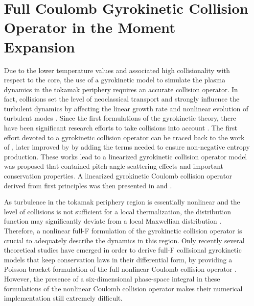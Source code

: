 \chapter{Full Coulomb Gyrokinetic Collision Operator in the Moment Expansion}
\label{ch:op}

Due to the lower temperature values and associated high collisionality with respect to the core, the use of a gyrokinetic model to simulate the plasma dynamics in the tokamak periphery requires an accurate collision operator.
%
In fact, collisions set the level of neoclassical transport and strongly influence the turbulent dynamics by affecting the linear growth rate and nonlinear evolution of turbulent modes \citep{Hirshman1981,Lin1999,Barnes2009}.
%
Since the first formulations of the gyrokinetic theory, there have been significant research efforts to take collisions into account \citep{Catto1977,Brizard2004,Abel2008,Barnes2009,Li2011,Esteve2015}.
%
The first effort devoted to a gyrokinetic collision operator can be traced back to the work of \citet{Catto1977}, later improved by \citet{Abel2008} by adding the terms needed to ensure non-negative entropy production.
%
These works lead to a linearized gyrokinetic collision operator model was proposed that contained pitch-angle scattering effects and important conservation properties.
%
A linearized gyrokinetic Coulomb collision operator derived from first principles was then presented in \citet{Li2011} and \citet{Madsen2013a}.

%
As turbulence in the tokamak periphery region is essentially nonlinear and the level of collisions is not sufficient for a local thermalization, the distribution function may significantly deviate from a local Maxwellian distribution \citep{Tskhakaya2012}.
%
Therefore, a nonlinear full-F formulation of the gyrokinetic collision operator is crucial to adequately describe the dynamics in this region.
%
Only recently several theoretical studies have emerged in order to derive full-F collisional gyrokinetic models that keep conservation laws in their differential form, by providing a Poisson bracket formulation of the full nonlinear Coulomb collision operator \citep{Brizard2004,Sugama2015,Burby2015}.
%
However, the presence of a six-dimensional phase-space integral in these formulations of the nonlinear Coulomb collision operator makes their numerical implementation still extremely difficult.

